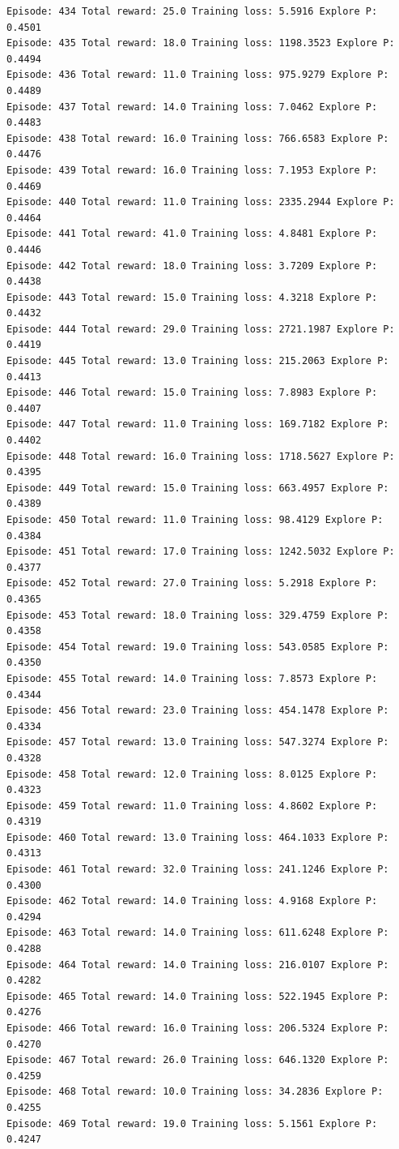 \documentclass[11pt]{article}
\begin{document}
\begin{Verbatim}[commandchars=\\\{\}]
Episode: 434 Total reward: 25.0 Training loss: 5.5916 Explore P: 0.4501
Episode: 435 Total reward: 18.0 Training loss: 1198.3523 Explore P: 0.4494
Episode: 436 Total reward: 11.0 Training loss: 975.9279 Explore P: 0.4489
Episode: 437 Total reward: 14.0 Training loss: 7.0462 Explore P: 0.4483
Episode: 438 Total reward: 16.0 Training loss: 766.6583 Explore P: 0.4476
Episode: 439 Total reward: 16.0 Training loss: 7.1953 Explore P: 0.4469
Episode: 440 Total reward: 11.0 Training loss: 2335.2944 Explore P: 0.4464
Episode: 441 Total reward: 41.0 Training loss: 4.8481 Explore P: 0.4446
Episode: 442 Total reward: 18.0 Training loss: 3.7209 Explore P: 0.4438
Episode: 443 Total reward: 15.0 Training loss: 4.3218 Explore P: 0.4432
Episode: 444 Total reward: 29.0 Training loss: 2721.1987 Explore P: 0.4419
Episode: 445 Total reward: 13.0 Training loss: 215.2063 Explore P: 0.4413
Episode: 446 Total reward: 15.0 Training loss: 7.8983 Explore P: 0.4407
Episode: 447 Total reward: 11.0 Training loss: 169.7182 Explore P: 0.4402
Episode: 448 Total reward: 16.0 Training loss: 1718.5627 Explore P: 0.4395
Episode: 449 Total reward: 15.0 Training loss: 663.4957 Explore P: 0.4389
Episode: 450 Total reward: 11.0 Training loss: 98.4129 Explore P: 0.4384
Episode: 451 Total reward: 17.0 Training loss: 1242.5032 Explore P: 0.4377
Episode: 452 Total reward: 27.0 Training loss: 5.2918 Explore P: 0.4365
Episode: 453 Total reward: 18.0 Training loss: 329.4759 Explore P: 0.4358
Episode: 454 Total reward: 19.0 Training loss: 543.0585 Explore P: 0.4350
Episode: 455 Total reward: 14.0 Training loss: 7.8573 Explore P: 0.4344
Episode: 456 Total reward: 23.0 Training loss: 454.1478 Explore P: 0.4334
Episode: 457 Total reward: 13.0 Training loss: 547.3274 Explore P: 0.4328
Episode: 458 Total reward: 12.0 Training loss: 8.0125 Explore P: 0.4323
Episode: 459 Total reward: 11.0 Training loss: 4.8602 Explore P: 0.4319
Episode: 460 Total reward: 13.0 Training loss: 464.1033 Explore P: 0.4313
Episode: 461 Total reward: 32.0 Training loss: 241.1246 Explore P: 0.4300
Episode: 462 Total reward: 14.0 Training loss: 4.9168 Explore P: 0.4294
Episode: 463 Total reward: 14.0 Training loss: 611.6248 Explore P: 0.4288
Episode: 464 Total reward: 14.0 Training loss: 216.0107 Explore P: 0.4282
Episode: 465 Total reward: 14.0 Training loss: 522.1945 Explore P: 0.4276
Episode: 466 Total reward: 16.0 Training loss: 206.5324 Explore P: 0.4270
Episode: 467 Total reward: 26.0 Training loss: 646.1320 Explore P: 0.4259
Episode: 468 Total reward: 10.0 Training loss: 34.2836 Explore P: 0.4255
Episode: 469 Total reward: 19.0 Training loss: 5.1561 Explore P: 0.4247

\end{Verbatim}
\end{document}
